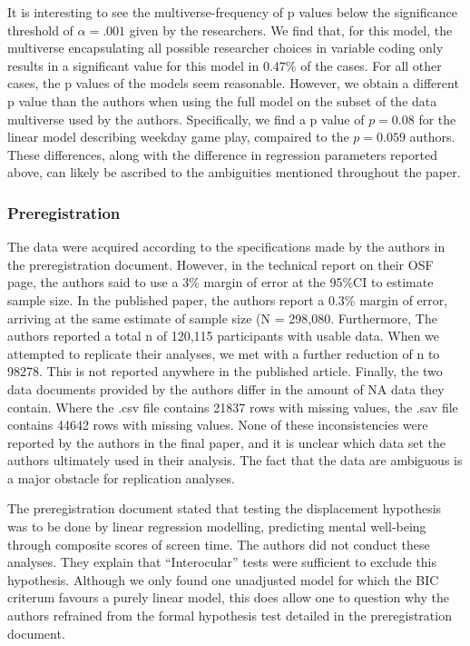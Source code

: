 \documentclass[floatsintext,man]{apa6}
\theoremstyle{definition}
\theoremstyle{definition}
\theoremstyle{definition}
\theoremstyle{remark}
\begin{document}
It is interesting to see the multiverse-frequency of p values below the
significance threshold of \(\alpha = .001\) given by the researchers. We
find that, for this model, the multiverse encapsulating all possible
researcher choices in variable coding only results in a significant
value for this model in \(0.47\%\) of the cases. For all other cases,
the p values of the models seem reasonable. However, we obtain a
different p value than the authors when using the full model on the
subset of the data multiverse used by the authors. Specifically, we find
a p value of \(p = 0.08\) for the linear model describing weekday game
play, compaired to the \(p = 0.059\) authors. These differences, along
with the difference in regression parameters reported above, can likely
be ascribed to the ambiguities mentioned throughout the paper.

\hypertarget{preregistration}{%
\subsubsection{Preregistration}\label{preregistration}}

The data were acquired according to the specifications made by the
authors in the preregistration document. However, in the technical
report on their OSF page, the authors said to use a 3\% margin of error
at the 95\%CI to estimate sample size. In the published paper, the
authors report a 0.3\% margin of error, arriving at the same estimate of
sample size (N = 298,080. Furthermore, The authors reported a total n of
120,115 participants with usable data. When we attempted to replicate
their analyses, we met with a further reduction of n to 98278. This is
not reported anywhere in the published article. Finally, the two data
documents provided by the authors differ in the amount of NA data they
contain. Where the .csv file contains 21837 rows with missing values,
the .sav file contains 44642 rows with missing values. None of these
inconsistencies were reported by the authors in the final paper, and it
is unclear which data set the authors ultimately used in their analysis.
The fact that the data are ambiguous is a major obstacle for replication
analyses.

The preregistration document stated that testing the displacement
hypothesis was to be done by linear regression modelling, predicting
mental well-being through composite scores of screen time. The authors
did not conduct these analyses. They explain that \enquote{Interocular}
tests were sufficient to exclude this hypothesis. Although we only found
one unadjusted model for which the BIC criterum favours a purely linear
model, this does allow one to question why the authors refrained from
the formal hypothesis test detailed in the preregistration document.
\end{document}
